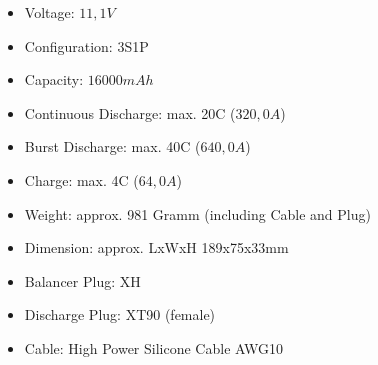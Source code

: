 \begin{itemize}
    \item Voltage: $11,1V$
    \item Configuration: 3S1P
    \item Capacity: $16000mAh$
    \item Continuous Discharge: max. 20C ($320,0A$)
    \item Burst Discharge: max. 40C ($640,0A$)
    \item Charge: max. 4C ($64,0A$)
    \item Weight: approx. 981 Gramm (including Cable and Plug)
    \item Dimension: approx. LxWxH 189x75x33mm
    \item Balancer Plug: XH
    \item Discharge Plug: XT90 (female)
    \item Cable: High Power Silicone Cable AWG10
\end{itemize}


